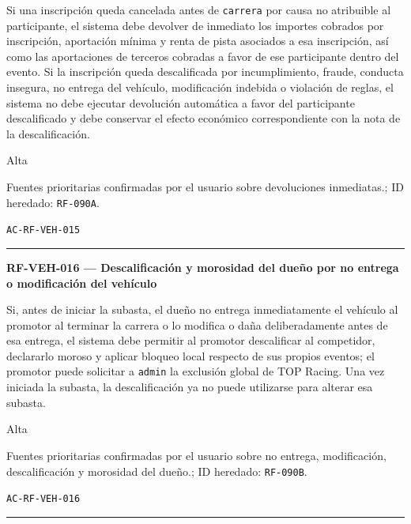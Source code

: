 \documentclass[10pt,letterpaper]{article}
\begin{document}
\begin{description}[style=nextline,leftmargin=3.15cm,labelwidth=2.8cm,font=\normalfont\bfseries]
\item[Obligación] Si una inscripción queda cancelada antes de \texttt{carrera} por causa no atribuible al participante, el sistema debe devolver de inmediato los importes cobrados por inscripción, aportación mínima y renta de pista asociados a esa inscripción, así como las aportaciones de terceros cobradas a favor de ese participante dentro del evento. Si la inscripción queda descalificada por incumplimiento, fraude, conducta insegura, no entrega del vehículo, modificación indebida o violación de reglas, el sistema no debe ejecutar devolución automática a favor del participante descalificado y debe conservar el efecto económico correspondiente con la nota de la descalificación.
\item[Prioridad] Alta
\item[Procedencia] Fuentes prioritarias confirmadas por el usuario sobre devoluciones inmediatas.; ID heredado: \texttt{RF-090A}.
\item[Verificación] \texttt{AC-RF-VEH-015}
\end{description}
\vspace{0.25em}\hrule\vspace{0.65em}
\noindent\textbf{RF-VEH-016 --- Descalificación y morosidad del dueño por no entrega o modificación del vehículo}\par
\begin{description}[style=nextline,leftmargin=3.15cm,labelwidth=2.8cm,font=\normalfont\bfseries]
\item[Obligación] Si, antes de iniciar la subasta, el dueño no entrega inmediatamente el vehículo al promotor al terminar la carrera o lo modifica o daña deliberadamente antes de esa entrega, el sistema debe permitir al promotor descalificar al competidor, declararlo moroso y aplicar bloqueo local respecto de sus propios eventos; el promotor puede solicitar a \texttt{admin} la exclusión global de TOP Racing. Una vez iniciada la subasta, la descalificación ya no puede utilizarse para alterar esa subasta.
\item[Prioridad] Alta
\item[Procedencia] Fuentes prioritarias confirmadas por el usuario sobre no entrega, modificación, descalificación y morosidad del dueño.; ID heredado: \texttt{RF-090B}.
\item[Verificación] \texttt{AC-RF-VEH-016}
\end{description}
\vspace{0.25em}\hrule\vspace{0.65em}
\end{document}
